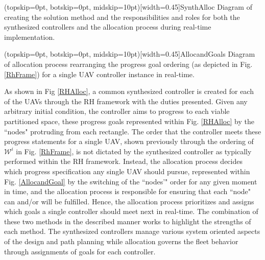 \documentclass{ieeeaccess}
\begin{document}
\Figure[t!](topskip=0pt, botskip=0pt, midskip=10pt)[width=0.45\textwidth]{SynthAlloc}
{Diagram of creating the solution method and the responsibilities and roles for both the synthesized controllers and the allocation process during real-time implementation.\label{RHAlloc}}

\Figure[t!](topskip=0pt, botskip=0pt, midskip=10pt)[width=0.45\textwidth]{AllocandGoals}
{Diagram of allocation process rearranging the progress goal ordering (as depicted in Fig. \ref{RhFrame}) for a single UAV controller instance in real-time.\label{AllocandGoal}}

As shown in Fig \ref{RHAlloc}, a common synthesized controller is created for each of the UAVs through the RH framework with the duties presented. Given any arbitrary initial condition, the controller aims to progress to each viable partitioned space, these progress goals represented within Fig. \ref{RHAlloc} by the ``nodes" protruding from each rectangle. The order that the controller meets these progress statements for a single UAV, shown previously through the ordering of $\mathscr{W}^i$ in Fig. \ref{RhFrame}, is not dictated by the synthesized controller as typically performed within the RH framework. Instead, the allocation process decides which progress specification any single UAV should pursue, represented within Fig. \ref{AllocandGoal} by the switching of the ``nodes'" order for any given moment in time, and the allocation process is responsible for ensuring that each ``node" can and/or will be fulfilled. Hence, the allocation process prioritizes and assigns which goals a single controller should meet next in real-time. The combination of these two methods in the described manner works to highlight the strengths of each method. The synthesized controllers manage various system oriented aspects of the design and path planning while allocation governs the fleet behavior through assignments of goals for each controller.
\end{document}
